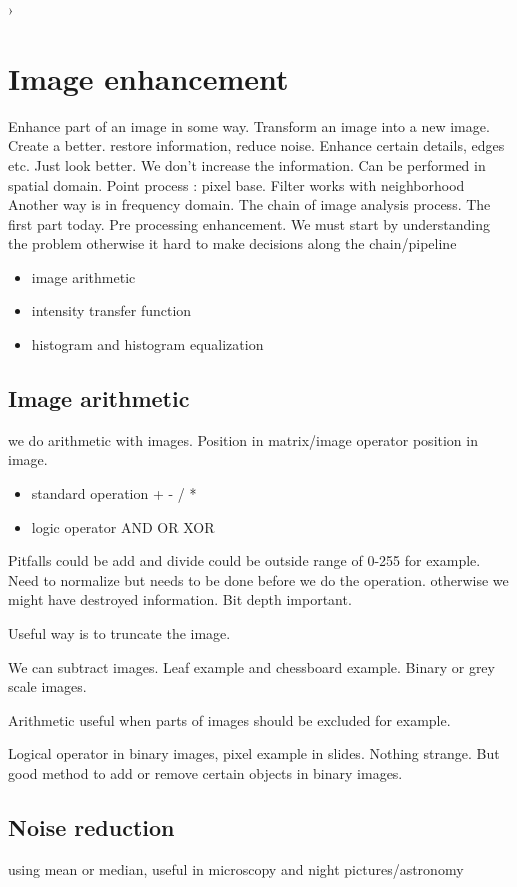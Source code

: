 ›
\section{Image enhancement}
Enhance part of an image in some way. Transform an image into a new image. Create a better. restore information, reduce noise.
Enhance certain details, edges etc. Just look better. 
We don't increase the information. Can be performed in spatial domain. Point process : pixel base. Filter works with neighborhood
Another way is in frequency domain. 
The chain of image analysis process. The first part today. Pre processing enhancement. We must start by understanding the problem otherwise it hard to make decisions along the chain/pipeline


\begin{itemize}
    \item image arithmetic
    \item intensity transfer function
    \item histogram and histogram equalization
\end{itemize}


\subsection*{Image arithmetic}
we do arithmetic with images. Position in matrix/image operator position in image. 

\begin{itemize}
    \item standard operation + - / *
    \item logic operator AND OR XOR
\end{itemize}

Pitfalls could be add and divide could be outside range of 0-255 for example. Need to normalize but needs to be done before we do the operation. otherwise we might have destroyed information. Bit depth important. 

Useful way is to truncate the image. 

We can subtract images. Leaf example and chessboard example. Binary or grey scale images. 

Arithmetic useful when parts of images should be excluded for example.

Logical operator in binary images, pixel example in slides. Nothing strange. But good method to add or remove certain objects in binary images. 

\subsection*{Noise reduction}
using mean or median, useful in microscopy and night pictures/astronomy

